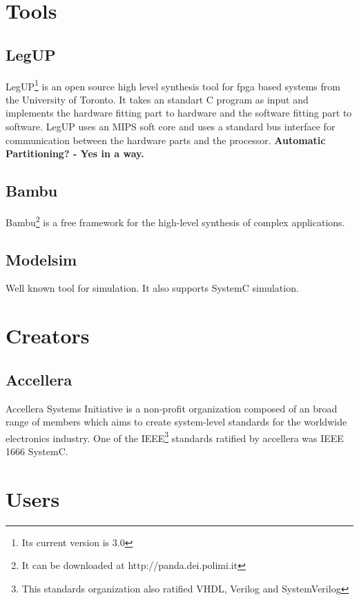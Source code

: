 \documentclass{article}
\begin{document}
	\section{Tools}	  
	  \subsection{LegUP}
	  LegUP\footnote{Its current version is 3.0} is an open source high level synthesis tool for fpga based systems from the University of Toronto. 
	  It takes an standart C program as input and implements the hardware fitting part to hardware and the software fitting part to software.
	  LegUP uses an MIPS soft core and uses a standard bus interface for communication between the hardware parts and the processor.  
	  \textbf{Automatic Partitioning? - Yes in a way.}
	  
	  \subsection{Bambu}
	  Bambu\footnote{It can be downloaded at http://panda.dei.polimi.it} is a free framework for the high-level synthesis of complex applications.
	  
	  \subsection{Modelsim}
	  Well known tool for simulation.
	  It also supports SystemC simulation.
	\section{Creators}
	  \subsection{Accellera}
	  Accellera Systems Initiative is a non-profit organization composed of an broad range of members which aims to create system-level standards for the worldwide electronics industry.
	  One of the IEEE\footnote{This standards organization also ratified VHDL, Verilog and SystemVerilog} standards ratified by accellera was IEEE 1666 SystemC.
	  
	\section{Users}
\end{document}
